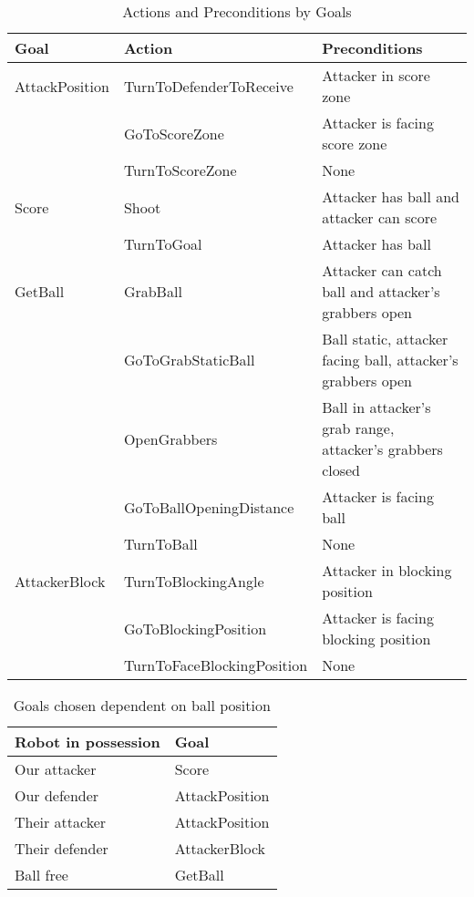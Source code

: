 \begin{table}[H]
  \centering
\begin{tabularx}{\textwidth}{l l X}
\toprule
\textbf{Goal} & \textbf{Action} & \textbf{Preconditions} \\ 
\midrule

AttackPosition & TurnToDefenderToReceive & Attacker in score zone \\ 
&GoToScoreZone & Attacker is facing score zone  \\ 
&TurnToScoreZone & None \\
\midrule

Score & Shoot & Attacker has ball and attacker can score \\ 
& TurnToGoal & Attacker has ball \\ 
\midrule

GetBall & GrabBall & Attacker can catch ball and attacker's grabbers open \\ 
& GoToGrabStaticBall & Ball static, attacker facing ball, attacker's grabbers open \\ &OpenGrabbers & Ball in attacker's grab range, attacker's grabbers closed \\ 
&GoToBallOpeningDistance & Attacker is facing ball \\
&TurnToBall & None \\ 
\midrule

AttackerBlock & TurnToBlockingAngle & Attacker in blocking position \\ 
& GoToBlockingPosition & Attacker is facing blocking position \\ 
& TurnToFaceBlockingPosition & None \\ 
\bottomrule
\end{tabularx}
\caption{Actions and Preconditions by Goals}
\label{tbl:goals-actions}
\end{table}


\begin{table}[H]
\centering
\begin{tabular}{ l l}
\toprule
\textbf{Robot in possession} & \textbf{Goal} \\ \midrule
Our attacker & Score \\
Our defender & AttackPosition \\
Their attacker & AttackPosition \\
Their defender & AttackerBlock \\
Ball free & GetBall \\ \bottomrule
\end{tabular}
\caption{Goals chosen dependent on ball position}
\label{tbl:goals}
\end{table}

